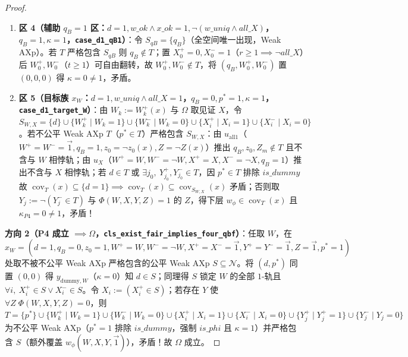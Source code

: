 \documentclass[11pt,a4paper]{article}
\newcommand{\N}{\mathcal{N}}
\newcommand{\cov}{\operatorname{cov}}
\newcommand{\code}[1]{\texttt{\small #1}}
\begin{document}
\begin{proof}
\begin{enumerate}
\[\begin{aligned}
      &\qquad\ X_{i\ne i_0}^+=X_{i\ne i_0}^-=1, Y^+=Y^-=\vec{1}, Z(x), p^*=1),\\
      u_{\mathrm{base},B} &= (d=1, q_B=0, z_0(x), W^+=\vec{0}, W^-=\vec{0}, X_{i_0}^+=0, X_{i\ne i_0}^+=1,\\
      &\qquad\ X^-=\vec{1}, Y^+=Y^-=\vec{1}, Z(x), p^*=1)
    \end{aligned}
  \]
  （$u_{\mathrm{base},B}$ 依赖 $t \ge 1$ 得 $\neg w\_ok$）。于是 $T$ 与 $u_{\mathrm{base},A}$ 在 $(d, z_0, W^+, W^-, X^+, Y^+, Y^-, Z, p^*)$ 一致且与 $u_{\mathrm{base},B}$ 在 $X^-=\vec{1}$ 一致：若 $q_B \notin T$，拼合 $u_{\mathrm{base},A}$ 其余坐标、$X^-=\vec{1}$ 与 $q_B=1$ 得 $w_{\mathrm{hit}} \in \cov_T(x)$（$w\_ok \land x\_ok \land \neg all\_X$，$\kappa=1$）；若 $X_{i_0}^+ \notin T$，拼合 $u_{\mathrm{base},A}$ 其余坐标、$X^-=\vec{1}$ 与 $X_{i_0}^+=1$（$q_B=0$）得 $w_{\mathrm{hit}} \in \cov_T(x)$（$w\_uniq \land all\_X$，$\kappa=1$），均矛盾！
  \item \textbf{区 4（辅助 $q_B=1$ 区：$d=1, w\_ok \land x\_ok=1, \neg(w\_uniq \land all\_X)$，$q_B=1, \kappa=1$，\code{case\_d1\_qB1}）}：令 $S_{qB}=\{q_B\}$（全空间唯一出现，Weak AXp）。若 $T$ 严格包含 $S_{qB}$ 则 $q_B \notin T$；置 $X_0^+=0, X_0^-=1$（$r \ge 1 \implies \neg all\_X$）后 $W_0^+, W_0^-$（$t \ge 1$）可自由翻转，故 $W_0^+, W_0^- \notin T$，将 $(q_B, W_0^+, W_0^-)$ 置 $(0,0,0)$ 得 $\kappa=0 \ne 1$，矛盾。
  \item \textbf{区 5（目标族 $x_W$：$d=1, w\_uniq \land all\_X=1$，$q_B=0, p^*=1, \kappa=1$，\code{case\_d1\_target\_W}）}：由 $W_k:=W_k^+(x)$ 与 $\Omega$ 取见证 $X$，令 $S_{W,X}=\{d\} \cup \{W_k^+ \mid W_k=1\} \cup \{W_k^- \mid W_k=0\} \cup \{X_i^+ \mid X_i=1\} \cup \{X_i^- \mid X_i=0\}$。若不公平 Weak AXp $T$（$p^* \in T$）严格包含 $S_{W,X}$：由 $u_{\mathrm{all1}}$（$W^+=W^-=\vec{1}, q_B=1, z_0=\neg z_0(x), Z=\neg Z(x)$）推出 $q_B, z_0, Z_m \notin T$ 且不含与 $W$ 相悖轨；由 $u_X$（$W^+=W, W^-=\neg W, X^+=X, X^-=\neg X, q_B=1$）推出不含与 $X$ 相悖轨；若 $d \in T$ 或 $\exists j_0,\ Y_{j_0}^+, Y_{j_0}^- \in T$，因 $p^* \in T$ 排除 $is\_dummy$ 故 $\cov_T(x) \subseteq \{d=1\} \implies \cov_T(x) \subseteq \cov_{S_{W,X}}(x)$ 矛盾；否则取 $Y_j := \neg(Y_j^- \in T)$ 与 $\Phi(W,X,Y,Z)=1$ 的 $Z$，得下层 $w_\phi \in \cov_T(x)$ 且 $\kappa_{P4}=0 \ne 1$，矛盾！
\end{enumerate}

\textbf{方向 2（P4 成立 $\implies \Omega$，\code{cls\_exist\_fair\_implies\_four\_qbf}）}：任取 $W$，在 $x_W=(d=1, q_B=0, z_0=1, W^+=W, W^-=\neg W, X^+=X^-=\vec{1}, Y^+=Y^-=\vec{1}, Z=\vec{1}, p^*=1)$ 处取不被不公平 Weak AXp 严格包含的公平 Weak AXp $S \subseteq \N$。将 $(d, p^*)$ 同置 $(0,0)$ 得 $y_{\mathrm{dummy},W}$（$\kappa=0$）知 $d \in S$；同理得 $S$ 锁定 $W$ 的全部 $1$-轨且 $\forall i,\ X_i^+ \in S \lor X_i^- \in S$。令 $X_i := (X_i^+ \in S)$；若存在 $Y$ 使 $\forall Z\;\Phi(W,X,Y,Z)=0$，则 $T=\{p^*\} \cup \{W_k^+ \mid W_k=1\} \cup \{W_k^- \mid W_k=0\} \cup \{X_i^+ \mid X_i=1\} \cup \{X_i^- \mid X_i=0\} \cup \{Y_j^+ \mid Y_j^+=1\} \cup \{Y_j^- \mid Y_j=0\}$ 为不公平 Weak AXp（$p^*=1$ 排除 $is\_dummy$，强制 $is\_phi$ 且 $\kappa=1$）并严格包含 $S$（额外覆盖 $w_\phi(W,X,Y,\vec{1})$），矛盾！故 $\Omega$ 成立。
\end{proof}
\end{document}
